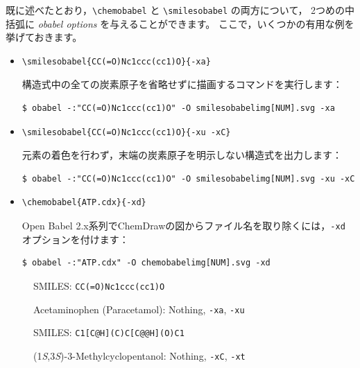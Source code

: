 \documentclass[12pt]{ltjsarticle}
\def\Lcode#1{\texttt{#1}}
\def\Lmeta#1{\textit{#1}}
\begin{document}
既に述べたとおり，\verb|\chemobabel| と \verb|\smilesobabel| の両方について，
2つめの中括弧に \Lmeta{obabel options} を与えることができます。
ここで，いくつかの有用な例を挙げておきます。
\begin{itemize}
\item
\begin{verbatim}
\smilesobabel{CC(=O)Nc1ccc(cc1)O}{-xa}
\end{verbatim}
構造式中の全ての炭素原子を省略せずに描画するコマンドを実行します：
\begin{verbatim}
$ obabel -:"CC(=O)Nc1ccc(cc1)O" -O smilesobabelimg[NUM].svg -xa
\end{verbatim}
\item
\begin{verbatim}
\smilesobabel{CC(=O)Nc1ccc(cc1)O}{-xu -xC}
\end{verbatim}
元素の着色を行わず，末端の炭素原子を明示しない構造式を出力します：
\begin{verbatim}
$ obabel -:"CC(=O)Nc1ccc(cc1)O" -O smilesobabelimg[NUM].svg -xu -xC
\end{verbatim}
\item
\begin{verbatim}
\chemobabel{ATP.cdx}{-xd}
\end{verbatim}
Open Babel 2.x系列でChemDrawの図からファイル名を取り除くには，\Lcode{-xd} オプションを付けます：
\begin{verbatim}
$ obabel -:"ATP.cdx" -O chemobabelimg[NUM].svg -xd
\end{verbatim}
\end{itemize}

\begin{figure}[ht]
  \centering
   \hspace{1cm}
   \hspace{1cm}
  \caption{Acetaminophen (Paracetamol): Nothing, \Lcode{-xa}, \Lcode{-xu}}
  SMILES: \verb|CC(=O)Nc1ccc(cc1)O|
\end{figure}

\begin{figure}[ht]
  \centering
   \hspace{1cm}
   \hspace{1cm}
  \caption{(1\textit{S},3\textit{S})-3-Methylcyclopentanol: Nothing, \Lcode{-xC}, \Lcode{-xt}}
  SMILES: \verb|C1[C@H](C)C[C@@H](O)C1|
\end{figure}
\end{document}
